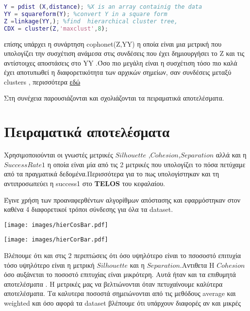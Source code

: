\begin{lstlisting}[language=Matlab]
%simple example of hierarchical clustering
Y = pdist (X,distance); %X is an array containig the data
YY = squareform(Y); %convert Y in a square form
Z =linkage(YY,); %find  hierarchical cluster tree,
CDX = cluster(Z,'maxclust',8);
\end{lstlisting}


επίσης υπάρχει η συνάρτηση cophonet(Z,YY) η οποία είναι μια μετρική που υπολογίζει την συσχέτιση ανάμεσα στις συνδέσεις που έχει δημιουργήσει το Z και τις αντίστοιχες αποστάσεις στο YY .Όσο πιο μεγάλη είναι η συσχέτιση τόσο πιο καλά έχει αποτυπωθεί η διαφορετικότητα των αρχικών σημείων, σαν συνδέσεις μεταξύ clusters , περισσότερα
\href{https://en.wikipedia.org/wiki/Cophenetic_correlation}{εδώ}

Στη συνέχεια παρουσιάζονται και σχολιάζονται τα πειραματικά αποτελέσματα.

\section{Πειραματικά αποτελέσματα}

Χρησιμοποιούνται οι γνωστές μετρικές $Silhouette$ ,$Cohesion$,$Separation$
αλλά και η $Success Rate 1$ η οποία είναι μία από τις 2 μετρικές που  υπολογίζει το πόσα πετύχαμε από τα πραγματικά δεδομένα.Περισσότερα για το πως υπολογίστηκαν και τη αντιπροσωπεύει η success1 στο \textbf{TELOS} του κεφαλαίου.    

Έγινε χρήση των προαναφερθέντων αλγορίθμων απόστασης και εφαρμόστηκαν στον καθένα 4 διαφορετικοί τρόποι σύνδεσης για όλα τα dataset.

\noindent\begin{minipage}{\linewidth}
    \centering
    \texttt{[image: images/hierCosBar.pdf]}
    \label{fig:CosineHier}
\end{minipage}

\noindent\begin{minipage}{\linewidth}
    \centering
    \texttt{[image: images/hierCorBar.pdf]}
    \label{fig:hierCorBar}
\end{minipage}

\newpage
Βλέπουμε ότι και στις 2 περιπτώσεις ότι όσο υψηλότερο είναι το πσοσοστό επιτυχία
τόσο υψηλότερο είναι  η μετρική $Silhouette$ και η $Separation$.Αντιθετα H $Cohesion$ όσο αυξάνεται το ποσοστό επιτυχίας είναι μικρότερη. Αυτά ήταν και τα επιθυμητά αποτελέσματα . Η μετρικές μας να βελτιώνονται όταν πετυχαίνουμε καλύτερα αποτελέσματα. 
Τα καλυτερα ποσοστά σημειώνονται από τις μεθόδους average και weighted
και όσο αφορά τα dataset βλέπουμε ότι υπάρχουν διαφορές αν και μικρές

